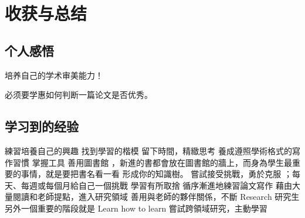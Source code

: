 \chapter{收获与总结}

\section{个人感悟}

培养自己的学术审美能力！

必须要学惠如何判断一篇论文是否优秀。


\section{学习到的经验}
練習培養自己的興趣 
找到學習的楷模 
留下時間，精緻思考 
養成遵照學術格式的寫作習慣 
掌握工具
善用圖書館 ，新進的書都會放在圖書館的牆上，而身為學生最重要的事情，就是要把書名看一看
形成你的知識樹。
嘗試接受挑戰，勇於克服 ；每天、每週或每個月給自己一個挑戰
學習有所取捨 
循序漸進地練習論文寫作
藉由大量閱讀和老師提點，進入研究領域 
善用與老師的夥伴關係，不斷 Research
研究生另外一個重要的階段就是 Learn how to learn
嘗試跨領域研究，主動學習